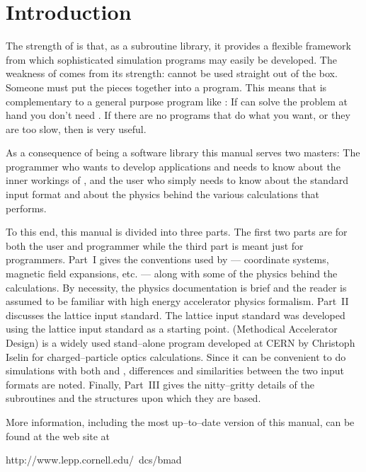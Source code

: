 \section*{Introduction}

The strength of \bmad is that, as a subroutine library, it provides a
flexible framework from which sophisticated simulation programs may
easily be developed.  The weakness of \bmad comes from its strength:
\bmad cannot be used straight out of the box. Someone must put the
pieces together into a program. This means that \bmad is
complementary to a general purpose program like
\MAD\cite{b:maduser,b:madphysics}: If \mad can solve the problem at
hand you don't need \bmad. If there are no programs that do what you
want, or they are too slow, then \bmad is very useful.

As a consequence of \bmad being a software library this manual serves
two masters: The programmer who wants to develop applications and
needs to know about the inner workings of \bmad, and the user who
simply needs to know about the \bmad standard input format and about
the physics behind the various calculations that \bmad performs.

To this end, this manual is divided into three parts. The first two
parts are for both the user and programmer while the third part is
meant just for programmers. Part~I gives the conventions used by
\bmad --- coordinate systems, magnetic field expansions, etc. ---
along with some of the physics behind the calculations. By necessity,
the physics documentation is brief and the reader is assumed to be familiar
with high energy accelerator physics formalism. Part~II discusses the
\bmad lattice input standard.  The \bmad lattice input standard was
developed using the \mad lattice input standard as a starting
point. \mad (Methodical Accelerator Design) is a widely used
stand--alone program developed at CERN by Christoph Iselin for
charged--particle optics calculations. Since it can be convenient
to do simulations with both \mad and \bmad, differences and
similarities between the two input formats are noted. 
Finally, Part~III gives the nitty--gritty details of the \bmad
subroutines and the structures upon which they are based.

More information, including the most up--to--date version of this
manual, can be found at the \bmad web site at
\begin{example}
  http://www.lepp.cornell.edu/~dcs/bmad
\end{example}


